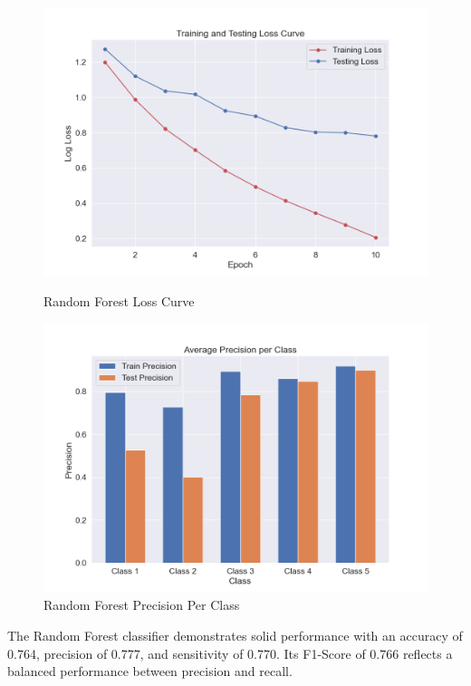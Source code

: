 	\vspace{1em}
\begin{figure}[H]
	\begin{minipage}[t]{0.48\textwidth}
		\centering
		\includegraphics[width=\textwidth]{img/paper_1/loss_curve.png}
		\caption{Random Forest Loss Curve}
	\end{minipage}
	\hfill
	\begin{minipage}[t]{0.48\textwidth}
		\centering
		\includegraphics[width=\textwidth]{img/paper_1/precision_per_class.png}
		\caption{Random Forest Precision Per Class}
	\end{minipage}
\end{figure}

The Random Forest classifier demonstrates solid performance with an accuracy of 0.764, precision of 0.777, and sensitivity of 0.770. Its F1-Score of 0.766 reflects a balanced performance between precision and recall. 


